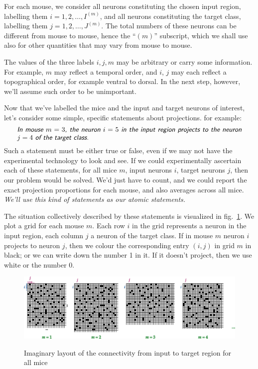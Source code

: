 \documentclass[\ifafour a4paper,12pt,\else a5paper,10pt,\fi%
onecolumn,oneside,article,%
british%
]{memoir}
\theoremstyle{remark}
\theoremstyle{innote}
\renewcommand*{\|}[1][]{\nonscript\,#1\vert\nonscript\;\mathopen{}}
\newcommand*{\fig}{fig.}%
\newcommand*{\statm}[1]{\textsl{\textsf{#1}}}
\newcommand*{\yIm}[1][m]{I^{(#1)}}
\newcommand*{\yJm}[1][m]{J^{(#1)}}
\begin{document}
For each mouse, we consider all neurons constituting the chosen input
region, labelling them $i=1,2,\dotsc, \yIm$, and all neurons constituting
the target class, labelling them $j=1,2,\dotsc, \yJm$. The total numbers
of these neurons can be different from mouse to mouse, hence the 
\enquote{$(m)$} subscript, which we shall use also for other quantities
that may vary from mouse to mouse.

The values of the three labels $i,j,m$ may be arbitrary or carry some
information. For example, $m$ may reflect a temporal order, and $i$, $j$
may each reflect a topographical order, for example ventral to dorsal. In
the next step, however, we'll assume such order to be unimportant.

\medskip


Now that we've labelled the mice and the input and target neurons of
interest, let's consider some simple, specific statements about
projections. for example:
\[\parbox{0.95\linewidth}{\statm{In mouse $m=3$, the neuron $i=5$ in the input
      region projects to the neuron $j=4$ of the target class.}}\]
Such a statement must be either true or false, even if we may not have the
experimental technology to look and see. If we could experimentally
ascertain each of these statements, for all mice $m$, input neurons $i$,
target neurons $j$, then our problem would be solved. We'd just have to
count, and we could report the exact projection proportions for each mouse,
and also averages across all mice. \emph{We'll use this kind of statements as our
atomic statements.}

The situation collectively described by these statements is visualized in
\fig~\ref{fig:cmij}. We plot a grid for each mouse $m$. Each row $i$ in the
grid represents a neuron in the input region, each column $j$ a neuron of
the target class. If in mouse $m$ neuron $i$ projects to neuron $j$, then
we colour the corresponding entry $(i,j)$ in grid $m$ in black; or we can
write down the number 1 in it. If it doesn't project, then we use white or
the number 0.
\begin{figure}[t!]%
 \centering\includegraphics[width=\linewidth]{bente_notes_drawings.png}\\
 \caption{Imaginary layout of the connectivity from input to target region
   for all mice}\label{fig:cmij}
\end{figure}%
\end{document}
